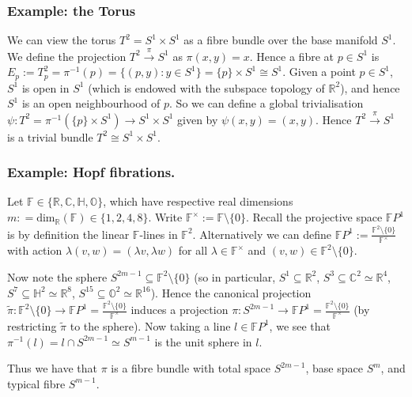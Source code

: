 \documentclass[a4paper]{article}
\theoremstyle{definition} \newtheorem*{definition}{Definition}
\theoremstyle{definition} \newtheorem*{definitions}{Definitions}
\theoremstyle{plain} \newtheorem{theorem}{Theorem}[section]
\theoremstyle{plain} \newtheorem{proposition}[theorem]{Proposition}
\theoremstyle{plain} \newtheorem{corollary}[theorem]{Corollary}
\theoremstyle{plain} \newtheorem{lemma}[theorem]{Lemma}
\theoremstyle{plain} \newtheorem{example}[theorem]{Example}
\newcommand{\realnos}{\mathbb{R}}
\newcommand{\complexnos}{\mathbb{C}}
\begin{document}
\subsubsection{Example: the Torus}
We can view the torus $T^2=S^1\times S^1$ as a fibre bundle over the base manifold $S^1$. We define the projection $T^2 \xrightarrow{\pi} S^1$ as $\pi(x, y)=x$. Hence a fibre at $p\in S^1$ is $E_p := T^2_p = \pi^{-1}(p) = \{(p, y): y\in S^1\} = \{p\}\times S^1 \cong S^1$. Given a point $p\in S^1$, $S^1$ is open in $S^1$ (which is endowed with the subspace topology of $\realnos^2$), and hence $S^1$ is an open neighbourhood of $p$. So we can define a global trivialisation $\psi:T^2=\pi^{-1}(\{p\}\times S^1)\to S^1 \times S^1$ given by $\psi(x, y)=(x, y)$. Hence $T^2 \xrightarrow{\pi} S^1$ is a trivial bundle $T^2\cong S^1\times S^1$. 

\subsubsection{Example: Hopf fibrations.}

Let $\mathbb{F}\in \{\realnos, \complexnos, \mathbb{H}, \mathbb{O}\}$, which have respective real dimensions $m: = \text{dim}_\realnos (\mathbb{F})\in \{1,2,4,8\}$. Write $\mathbb{F}^\times := \mathbb{F}\setminus \{0\}$. Recall the projective space $\mathbb{F}P^1$ is by definition the linear $\mathbb{F}$-lines in $\mathbb{F}^2$. Alternatively we can define  $\mathbb{F}P^1:=\frac{\mathbb{F}^2 \setminus \{0\}}{\mathbb{F}^\times}$ with action $\lambda (v, w)=(\lambda v, \lambda w)$ for all $\lambda \in \mathbb{F}^\times$ and $(v,w)\in \mathbb{F}^2 \setminus \{0\}$.  

Now note the sphere $S^{2m-1}\subseteq \mathbb{F}^2\setminus \{0\}$ (so in particular, $S^1 \subseteq \realnos^2$, $S^3 \subseteq \complexnos^2 \simeq \realnos^4$, $S^7\subseteq \mathbb{H}^2 \simeq \realnos^8$, $S^{15}\subseteq \mathbb{O}^2\simeq \realnos^{16}$). Hence the canonical projection $\tilde{\pi}:\mathbb{F}^2 \setminus \{0\} \to \mathbb{F}P^1=\frac{\mathbb{F}^2 \setminus \{0\}}{\mathbb{F}^\times}$ induces a projection $\pi:S^{2m-1} \to \mathbb{F}P^1 = \frac{\mathbb{F}^2 \setminus \{0\}}{\mathbb{F}^\times}$ (by restricting $\tilde{\pi}$ to the sphere). 
Now taking a line $l\in \mathbb{F}P^1$, we see that $\pi^{-1}(l) = l \cap S^{2m-1} \simeq S^{m-1}$ is the unit sphere in $l$. 

Thus we have that $\pi$ is a fibre bundle with total space $S^{2m-1}$, base space $S^m$, and typical fibre $S^{m-1}$. 
\end{document}
